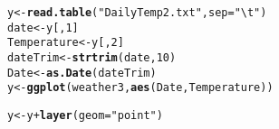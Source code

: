 \documentclass{article}\usepackage{graphicx, color}
\makeatletter
\newcommand{\hlfunctioncall}[1]{\textcolor[rgb]{0.501960784313725,0,0.329411764705882}{\textbf{#1}}}%
\newcommand{\hlstring}[1]{\textcolor[rgb]{0.6,0.6,1}{#1}}%
\newenvironment{kframe}{%
 \def\at@end@of@kframe{}%
 \ifinner\ifhmode%
  \def\at@end@of@kframe{\end{minipage}}%
  \begin{minipage}{\columnwidth}%
 \fi\fi%
 \def\FrameCommand##1{\hskip\@totalleftmargin \hskip-\fboxsep
 \colorbox{shadecolor}{##1}\hskip-\fboxsep
     \hskip-\linewidth \hskip-\@totalleftmargin \hskip\columnwidth}%
 \MakeFramed {\advance\hsize-\width
   \@totalleftmargin\z@ \linewidth\hsize
   \@setminipage}}%
 {\par\unskip\endMakeFramed%
 \at@end@of@kframe}
\newenvironment{knitrout}{}{} %
\makeatother
\begin{document}
\begin{knitrout}
\color{fgcolor}\begin{kframe}
\begin{alltt}
y <- \hlfunctioncall{read.table}(\hlstring{"DailyTemp2.txt"}, sep = \hlstring{"\textbackslash{}t"})
date <- y[, 1]
Temperature <- y[, 2]
dateTrim <- \hlfunctioncall{strtrim}(date, 10)
Date <- \hlfunctioncall{as.Date}(dateTrim)
y <- \hlfunctioncall{ggplot}(weather3, \hlfunctioncall{aes}(Date, Temperature))
\end{alltt}


{\ttfamily\noindent\bfseries\color{errorcolor}{\#\# Error: could not find function "ggplot"}}\begin{alltt}
y <- y + \hlfunctioncall{layer}(geom = \hlstring{"point"})
\end{alltt}



\end{kframe}
\end{knitrout}
\end{document}
